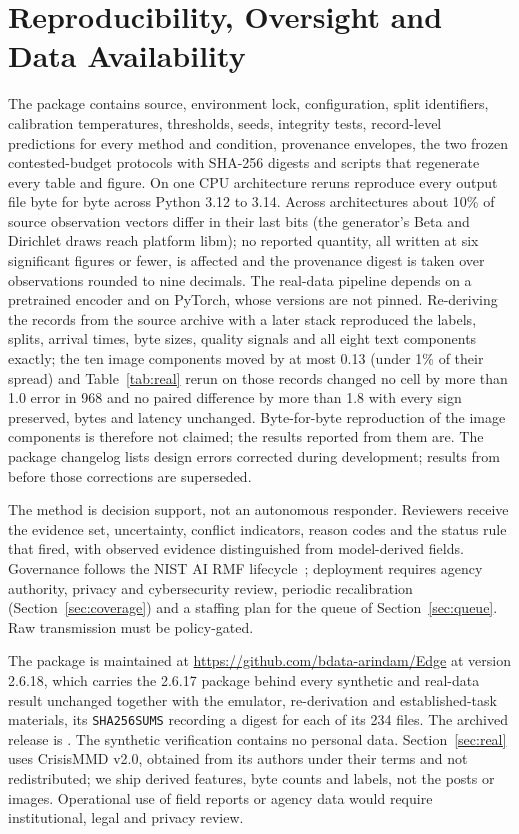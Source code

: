 \documentclass[conference,a4paper]{IEEEtran}
\newif\ifsubmission
\newcommand{\masteronly}[1]{\ifsubmission\else#1\fi}
\begin{document}
\section{Reproducibility, Oversight and Data Availability}
The package contains source, environment lock, configuration, split identifiers, calibration temperatures, thresholds, seeds, integrity tests, record-level predictions for every method and condition, provenance envelopes, the two frozen contested-budget protocols with SHA-256 digests and scripts that regenerate every table and figure. On one CPU architecture reruns reproduce every output file byte for byte across Python 3.12 to 3.14. \masteronly{Across architectures about 10\% of source observation vectors differ in their last bits (the generator's Beta and Dirichlet draws reach platform libm); no reported quantity, all written at six significant figures or fewer, is affected and the provenance digest is taken over observations rounded to nine decimals. }The real-data pipeline depends on a pretrained encoder and on PyTorch, whose versions are not pinned. Re-deriving the records from the source archive with a later stack reproduced the labels, splits, arrival times, byte sizes, quality signals and all eight text components exactly; the ten image components moved by at most 0.13 (under 1\% of their spread) and Table~\ref{tab:real} rerun on those records changed no cell by more than 1.0 error in 968 and no paired difference by more than 1.8 with every sign preserved, bytes and latency unchanged. Byte-for-byte reproduction of the image components is therefore not claimed; the results reported from them are.\masteronly{ The package changelog lists design errors corrected during development; results from before those corrections are superseded.}

The method is decision support, not an autonomous responder. Reviewers receive the evidence set, uncertainty, conflict indicators, reason codes and the status rule that fired, with observed evidence distinguished from model-derived fields. Governance follows the NIST AI RMF lifecycle~\cite{nistrmf}; deployment requires agency authority, privacy and cybersecurity review, periodic recalibration (Section~\ref{sec:coverage}) and a staffing plan for the queue of Section~\ref{sec:queue}. Raw transmission must be policy-gated.

The package is maintained at \url{https://github.com/bdata-arindam/Edge} at version 2.6.18, which carries the 2.6.17 package behind every synthetic and real-data result unchanged together with the emulator, re-derivation and established-task materials, its \texttt{SHA256SUMS} recording a digest for each of its 234 files. {\edef\tmpdoi{\archivedoi}\ifx\tmpdoi\empty\else The archived release is \texttt{\archivedoi}. \fi} The synthetic verification contains no personal data. Section~\ref{sec:real} uses CrisisMMD v2.0, obtained from its authors under their terms and not redistributed; we ship derived features, byte counts and labels, not the posts or images.\masteronly{ Operational use of field reports or agency data would require institutional, legal and privacy review.}
\end{document}
